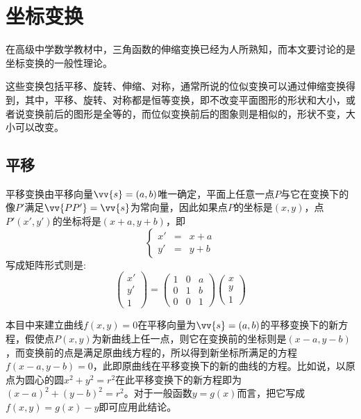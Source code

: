 
\section{坐标变换}
\label{sec:codinatie-axias-rotation}

在高级中学数学教材中，三角函数的伸缩变换已经为人所熟知，而本文要讨论的是坐标变换的一般性理论。

这些变换包括平移、旋转、伸缩、对称，通常所说的位似变换可以通过伸缩变换得到，其中，平移、旋转、对称都是恒等变换，即不改变平面图形的形状和大小，或者说变换前后的图形是全等的，而位似变换前后的图象则是相似的，形状不变，大小可以改变。

\subsection{平移}

平移变换由平移向量$\vv{s}=(a,b)$唯一确定，平面上任意一点$P$与它在变换下的像$P'$满足$\vv{PP'}=\vv{s}$为常向量，因此如果点$P$的坐标是$(x,y)$，点$P'(x',y')$的坐标将是$(x+a, y+b)$，即
\begin{equation}
  \label{eq:shift-translation-coordinate-formula}
  \left\{
      \begin{array}{ccc}
        x' & = & x + a \\
        y' & = & y + b
      \end{array}
  \right.
\end{equation}
写成矩阵形式则是:
\begin{equation}
  \label{eq:shift-translation-coordinate-formula-matrix}
  \left(
    \begin{array}{c}
      x' \\
      y' \\
      1
    \end{array}
  \right)
  =
  \left(
    \begin{array}{ccc}
      1 & 0 & a \\
      0 & 1 & b \\
      0 & 0 & 1
    \end{array}
  \right)
  \left(
    \begin{array}{c}
      x \\
      y \\
      1
    \end{array}
  \right)
\end{equation}

\begin{example}
  本目中来建立曲线$f(x,y)=0$在平移向量为$\vv{s}=(a,b)$的平移变换下的新方程，假使点$P(x,y)$为新曲线上任一点，则它在变换前的坐标则是$(x-a,y-b)$，而变换前的点是满足原曲线方程的，所以得到新坐标所满足的方程$f(x-a,y-b)=0$，此即原曲线在平移变换下的新的曲线的方程。比如说，以原点为圆心的圆$x^2+y^2=r^2$在此平移变换下的新方程即为$(x-a)^2+(y-b)^2=r^2$。对于一般函数$y=g(x)$而言，把它写成$f(x,y)=g(x)-y$即可应用此结论。
\end{example}

